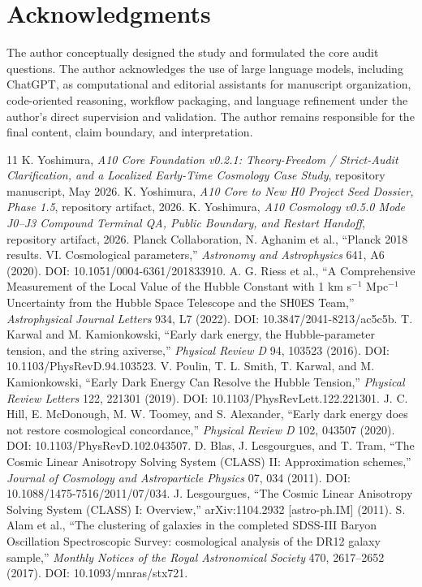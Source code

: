 \documentclass[11pt,a4paper]{article}
\begin{document}
\section*{Acknowledgments}

The author conceptually designed the study and formulated the core audit questions. The author acknowledges the use of large language models, including ChatGPT, as computational and editorial assistants for manuscript organization, code-oriented reasoning, workflow packaging, and language refinement under the author's direct supervision and validation. The author remains responsible for the final content, claim boundary, and interpretation.

\begin{thebibliography}{11}
 K. Yoshimura, \emph{A10 Core Foundation v0.2.1: Theory-Freedom / Strict-Audit Clarification, and a Localized Early-Time Cosmology Case Study}, repository manuscript, May 2026.
 K. Yoshimura, \emph{A10 Core to New H0 Project Seed Dossier, Phase 1.5}, repository artifact, 2026.
 K. Yoshimura, \emph{A10 Cosmology v0.5.0 Mode J0--J3 Compound Terminal QA, Public Boundary, and Restart Handoff}, repository artifact, 2026.
 Planck Collaboration, N. Aghanim et al., ``Planck 2018 results. VI. Cosmological parameters,'' \emph{Astronomy and Astrophysics} 641, A6 (2020). DOI: 10.1051/0004-6361/201833910.
 A. G. Riess et al., ``A Comprehensive Measurement of the Local Value of the Hubble Constant with 1 km s$^{-1}$ Mpc$^{-1}$ Uncertainty from the Hubble Space Telescope and the SH0ES Team,'' \emph{Astrophysical Journal Letters} 934, L7 (2022). DOI: 10.3847/2041-8213/ac5c5b.
 T. Karwal and M. Kamionkowski, ``Early dark energy, the Hubble-parameter tension, and the string axiverse,'' \emph{Physical Review D} 94, 103523 (2016). DOI: 10.1103/PhysRevD.94.103523.
 V. Poulin, T. L. Smith, T. Karwal, and M. Kamionkowski, ``Early Dark Energy Can Resolve the Hubble Tension,'' \emph{Physical Review Letters} 122, 221301 (2019). DOI: 10.1103/PhysRevLett.122.221301.
 J. C. Hill, E. McDonough, M. W. Toomey, and S. Alexander, ``Early dark energy does not restore cosmological concordance,'' \emph{Physical Review D} 102, 043507 (2020). DOI: 10.1103/PhysRevD.102.043507.
 D. Blas, J. Lesgourgues, and T. Tram, ``The Cosmic Linear Anisotropy Solving System (CLASS) II: Approximation schemes,'' \emph{Journal of Cosmology and Astroparticle Physics} 07, 034 (2011). DOI: 10.1088/1475-7516/2011/07/034.
 J. Lesgourgues, ``The Cosmic Linear Anisotropy Solving System (CLASS) I: Overview,'' arXiv:1104.2932 [astro-ph.IM] (2011).
 S. Alam et al., ``The clustering of galaxies in the completed SDSS-III Baryon Oscillation Spectroscopic Survey: cosmological analysis of the DR12 galaxy sample,'' \emph{Monthly Notices of the Royal Astronomical Society} 470, 2617--2652 (2017). DOI: 10.1093/mnras/stx721.
\end{thebibliography}
\end{document}
